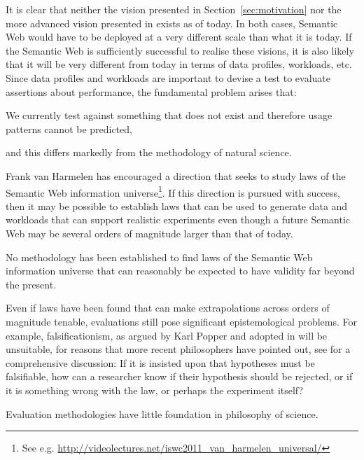 It is clear that neither the vision presented in
Section~\ref{sec:motivation} nor the more advanced vision presented in
\cite{berners2001semantic} exists as of today. In both cases, Semantic
Web would have to be deployed at a very different scale than what it
is today. If the Semantic Web is sufficiently successful to realise
these visions, it is also likely that it will be very different from
today in terms of data profiles, workloads, etc. Since data profiles
and workloads are important to devise a test to evaluate assertions
about performance, the fundamental problem arises that: 
\begin{problem}\label{prob:testingnonexist}
We currently test against something that does not exist and therefore
usage patterns cannot be predicted,
\end{problem}
and this differs markedly from the methodology of natural science.

Frank van Harmelen has encouraged a direction that seeks to study laws
of the Semantic Web information universe\footnote{See
  e.g. \url{http://videolectures.net/iswc2011_van_harmelen_universal/}}.
If this direction is pursued with success, then it may be possible to
establish laws that can be used to generate data and workloads that
can support realistic experiments even though a future Semantic Web
may be several orders of magnitude larger than that of today.


\begin{problem}\label{prob:lawsfuture}
No methodology has been established to find laws of the Semantic Web
information universe that can reasonably be expected to have validity
far beyond the present.
\end{problem}

Even if laws have been found that can make extrapolations across
orders of magnitude tenable, evaluations still pose significant
epistemological problems. For example, falsificationism, as argued by
Karl Popper and adopted in \cite{avinatguide} will be unsuitable, for
reasons that more recent philosophers have pointed out, see
\cite{chalmers1999whatis} for a comprehensive discussion: If it is
insisted upon that hypotheses must be falsifiable, how can a researcher
know if their hypothesis should be rejected, or if it is something
wrong with the law, or perhaps the experiment itself?


\begin{problem}\label{prob:badphil}
Evaluation methodologies have little foundation in philosophy of science.
\end{problem}


